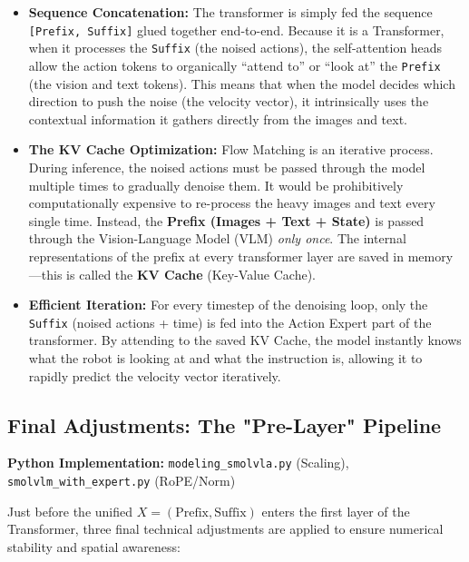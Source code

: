 \documentclass[11pt,a4paper]{article}
\begin{document}
\begin{itemize}
    \item \textbf{Sequence Concatenation:} The transformer is simply fed the sequence \texttt{[Prefix, Suffix]} glued together end-to-end. Because it is a Transformer, when it processes the \texttt{Suffix} (the noised actions), the self-attention heads allow the action tokens to organically ``attend to'' or ``look at'' the \texttt{Prefix} (the vision and text tokens). This means that when the model decides which direction to push the noise (the velocity vector), it intrinsically uses the contextual information it gathers directly from the images and text.
    \item \textbf{The KV Cache Optimization:} Flow Matching is an iterative process. During inference, the noised actions must be passed through the model multiple times to gradually denoise them. It would be prohibitively computationally expensive to re-process the heavy images and text every single time. Instead, the \textbf{Prefix (Images + Text + State)} is passed through the Vision-Language Model (VLM) \textit{only once}. The internal representations of the prefix at every transformer layer are saved in memory---this is called the \textbf{KV Cache} (Key-Value Cache). 
    \item \textbf{Efficient Iteration:} For every timestep of the denoising loop, only the \texttt{Suffix} (noised actions + time) is fed into the Action Expert part of the transformer. By attending to the saved KV Cache, the model instantly knows what the robot is looking at and what the instruction is, allowing it to rapidly predict the velocity vector iteratively.
\end{itemize}

\subsection{Final Adjustments: The "Pre-Layer" Pipeline}
\textbf{Python Implementation:} \texttt{modeling\_smolvla.py} (Scaling), \texttt{smolvlm\_with\_expert.py} (RoPE/Norm)

Just before the unified $X = (\text{Prefix}, \text{Suffix})$ enters the first layer of the Transformer, three final technical adjustments are applied to ensure numerical stability and spatial awareness:
\end{document}
